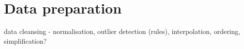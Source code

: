 
\chapter{Data preparation}

data cleansing - normalisation, outlier detection (rules), interpolation, ordering, simplification?